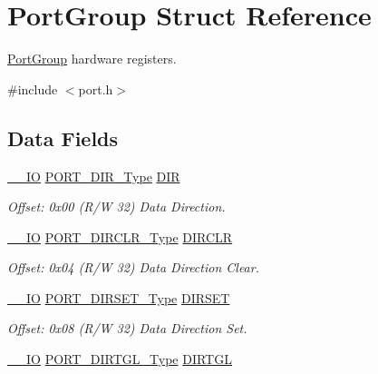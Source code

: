\hypertarget{struct_port_group}{}\section{Port\+Group Struct Reference}
\label{struct_port_group}


\mbox{\hyperlink{struct_port_group}{Port\+Group}} hardware registers.  




{\ttfamily \#include $<$port.\+h$>$}

\subsection*{Data Fields}
\begin{DoxyCompactItemize}
\item 
\mbox{\hyperlink{core__cm0plus_8h_aec43007d9998a0a0e01faede4133d6be}{\+\_\+\+\_\+\+IO}} \mbox{\hyperlink{union_p_o_r_t___d_i_r___type}{P\+O\+R\+T\+\_\+\+D\+I\+R\+\_\+\+Type}} \mbox{\hyperlink{struct_port_group_a4f40710bb20a5c26b854f025dcaf98ed}{D\+IR}}
\begin{DoxyCompactList}\small\item\em Offset\+: 0x00 (R/W 32) Data Direction. \end{DoxyCompactList}\item 
\mbox{\hyperlink{core__cm0plus_8h_aec43007d9998a0a0e01faede4133d6be}{\+\_\+\+\_\+\+IO}} \mbox{\hyperlink{union_p_o_r_t___d_i_r_c_l_r___type}{P\+O\+R\+T\+\_\+\+D\+I\+R\+C\+L\+R\+\_\+\+Type}} \mbox{\hyperlink{struct_port_group_a5c1f883a6c080fb0696d7ec5d3c9b89b}{D\+I\+R\+C\+LR}}
\begin{DoxyCompactList}\small\item\em Offset\+: 0x04 (R/W 32) Data Direction Clear. \end{DoxyCompactList}\item 
\mbox{\hyperlink{core__cm0plus_8h_aec43007d9998a0a0e01faede4133d6be}{\+\_\+\+\_\+\+IO}} \mbox{\hyperlink{union_p_o_r_t___d_i_r_s_e_t___type}{P\+O\+R\+T\+\_\+\+D\+I\+R\+S\+E\+T\+\_\+\+Type}} \mbox{\hyperlink{struct_port_group_a0bee31d59989e54e9748f3f31a71e1a5}{D\+I\+R\+S\+ET}}
\begin{DoxyCompactList}\small\item\em Offset\+: 0x08 (R/W 32) Data Direction Set. \end{DoxyCompactList}\item 
\mbox{\hyperlink{core__cm0plus_8h_aec43007d9998a0a0e01faede4133d6be}{\+\_\+\+\_\+\+IO}} \mbox{\hyperlink{union_p_o_r_t___d_i_r_t_g_l___type}{P\+O\+R\+T\+\_\+\+D\+I\+R\+T\+G\+L\+\_\+\+Type}} \mbox{\hyperlink{struct_port_group_acc3c81a100cc3d9fa45d164b26667492}{D\+I\+R\+T\+GL}}

\end{DoxyCompactItemize}
